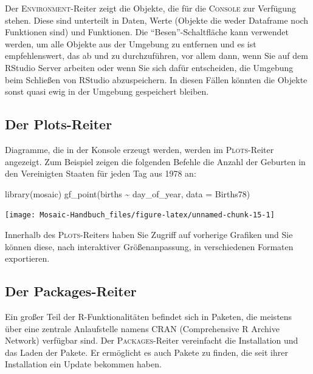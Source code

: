 \documentclass[
  ngerman,
]{scrbook}
\newenvironment{Shaded}{\begin{snugshade}}{\end{snugshade}}
\newcommand{\AttributeTok}[1]{\textcolor[rgb]{0.77,0.63,0.00}{#1}}
\newcommand{\FunctionTok}[1]{\textcolor[rgb]{0.00,0.00,0.00}{#1}}
\newcommand{\NormalTok}[1]{#1}
\newcommand{\SpecialCharTok}[1]{\textcolor[rgb]{0.00,0.00,0.00}{#1}}
\begin{document}
Der \textsc{Environment}-Reiter zeigt die Objekte, die für die \textsc{Console} zur Verfügung stehen. Diese sind unterteilt in Daten, Werte (Objekte die weder Dataframe noch Funktionen sind) und Funktionen. Die ``Besen''-Schaltfläche kann verwendet werden, um alle Objekte aus der Umgebung zu entfernen und es ist empfehlenswert, das ab und zu durchzuführen, vor allem dann, wenn Sie auf dem \textsf{RStudio} Server arbeiten oder wenn Sie sich dafür entscheiden, die Umgebung beim Schließen von \textsf{RStudio} abzuspeichern. In diesen Fällen könnten die Objekte sonst quasi ewig in der Umgebung gespeichert bleiben.

\hypertarget{der-plots-reiter}{%
\subsection{Der Plots-Reiter}\label{der-plots-reiter}}

Diagramme, die in der Konsole erzeugt werden, werden im \textsc{Plots}-Reiter angezeigt. Zum Beispiel zeigen die folgenden Befehle die Anzahl der Geburten in den Vereinigten Staaten für jeden Tag aus 1978 an:

\begin{Shaded}
\begin{Highlighting}[]
\FunctionTok{library}\NormalTok{(mosaic)}
\FunctionTok{gf\_point}\NormalTok{(births }\SpecialCharTok{\textasciitilde{}}\NormalTok{ day\_of\_year, }\AttributeTok{data =}\NormalTok{ Births78) }
\end{Highlighting}
\end{Shaded}

\begin{center}\texttt{[image: Mosaic-Handbuch\_files/figure-latex/unnamed-chunk-15-1]} \end{center}

Innerhalb des \textsc{Plots}-Reiters haben Sie Zugriff auf vorherige Grafiken und Sie können diese, nach interaktiver Größenanpassung, in verschiedenen Formaten exportieren.

\hypertarget{der-packages-reiter}{%
\subsection{Der Packages-Reiter}\label{der-packages-reiter}}

Ein großer Teil der \textsf{R}-Funktionalitäten befindet sich in Paketen, die meistens über eine zentrale Anlaufstelle namens CRAN (Comprehensive \textsf{R} Archive Network) verfügbar sind. Der \textsc{Packages}-Reiter vereinfacht die Installation und das Laden der Pakete. Er ermöglicht es auch Pakete zu finden, die seit ihrer Installation ein Update bekommen haben.
\end{document}
